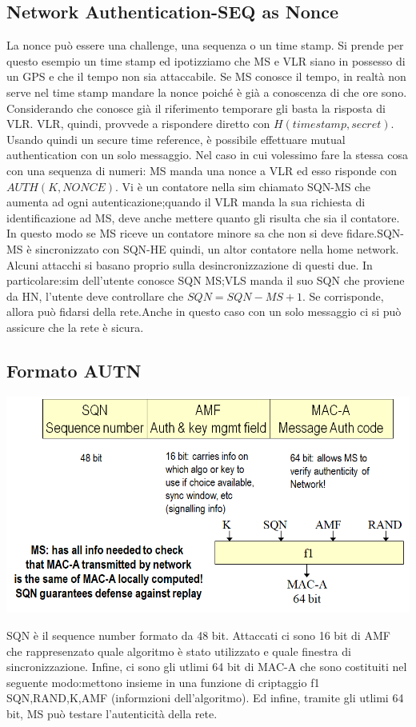 \documentclass{book}
\theoremstyle{remark}
\begin{document}
\subsection{Network Authentication-SEQ as Nonce}
La nonce può essere una challenge, una sequenza o un time stamp\@. Si prende per questo esempio un time stamp ed ipotizziamo che MS e VLR siano in possesso di un GPS e che il tempo non sia attaccabile\@. Se MS conosce il tempo, in realtà non serve nel time stamp mandare la nonce poiché è già a conoscenza di che ore sono\@. Considerando che conosce già il riferimento temporare gli basta la risposta di VLR\@. VLR, quindi, provvede a rispondere diretto con \(H (timestamp,secret)\)\@. Usando quindi un secure time reference, è possibile effettuare mutual authentication con un solo messaggio\@.\newline
Nel caso in cui volessimo fare la stessa cosa con una sequenza di numeri:\newline
MS manda una nonce a VLR ed esso risponde con \(AUTH (K,NONCE)\)\@.  Vi è un contatore nella sim chiamato SQN-MS che aumenta ad ogni autenticazione; quando il VLR manda la sua richiesta di identificazione ad MS, deve anche mettere quanto gli risulta che sia il contatore\@. In questo modo se MS riceve un contatore minore sa che non si deve fidare\@.SQN-MS è sincronizzato con SQN-HE quindi, un altor contatore nella home network\@. Alcuni attacchi si basano proprio sulla desincronizzazione di questi due\@. In particolare:\@la sim dell'utente conosce SQN MS;\@quando VLS manda il suo SQN che proviene da HN, l'utente deve controllare che \(SQN=SQN-MS+1\)\@. Se corrisponde, allora può fidarsi della rete\@.\newline Anche in questo caso con un solo messaggio ci si può assicure che la rete è sicura\@.
\subsection{Formato AUTN}
\begin{center}
	\includegraphics[scale=0.5]{AUTNFORMAT.png}
\end{center}
SQN è il sequence number formato da 48 bit\@. Attaccati ci sono 16 bit di AMF che rappresenzato quale algoritmo è stato utilizzato e quale finestra di sincronizzazione\@. Infine, ci sono gli utlimi 64 bit di MAC-A che sono costituiti nel seguente modo:\@si mettono insieme in una funzione di criptaggio f1 SQN,RAND,K,AMF (informzioni dell'algoritmo)\@. Ed infine, tramite gli utlimi 64 bit, MS può testare l'autenticità della rete\@.
\end{document}
